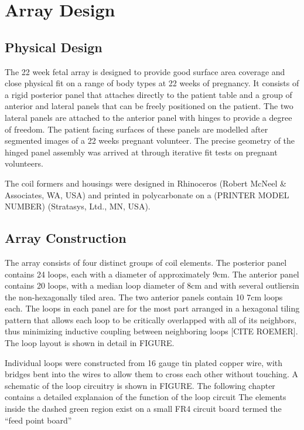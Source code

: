 \chapter{Array Design}
\section{Physical Design}
The 22 week fetal array is designed to provide good surface area coverage and close physical fit on a range of body
types at 22 weeks of pregnancy.  It consists of a rigid posterior panel that attaches directly to the patient table and
a group of anterior and lateral panels that can be freely positioned on the patient. The two lateral panels are attached
to the anterior panel with hinges to provide a degree of freedom. The patient facing surfaces of these panels are
modelled after segmented images of a 22 weeks pregnant volunteer. The precise geometry of the hinged panel assembly was
arrived at through iterative fit tests on pregnant volunteers.
  
The coil formers and housings were designed in Rhinoceros (Robert McNeel \& Associates, WA, USA) and printed in
polycarbonate on a (PRINTER MODEL NUMBER) (Stratasys, Ltd., MN, USA).

\section{Array Construction}
The array consists of four distinct groups of coil elements. The posterior panel contains 24 loops, each with a diameter
of approximately 9cm. The anterior panel contains 20 loops, with a median loop diameter of 8cm and with several
outliersin the non-hexagonally tiled area. The two anterior panels contain 10 7cm loops each. The loops in each panel
are for the most part arranged in a hexagonal tiling pattern that allows each loop to be critically overlapped with all
of its neighbors,  thus minimizing inductive coupling between neighboring loops [CITE ROEMER]. The loop layout is shown
in detail in FIGURE.

Individual loops were constructed from 16 gauge tin plated copper wire, with bridges bent into the wires to allow them
to cross each other without touching. A schematic of the loop circuitry is shown in FIGURE. The following chapter
contains a detailed explanaion of the function of the loop circuit The elements inside the dashed green region exist on
a small FR4 circuit board termed the “feed point board” 
